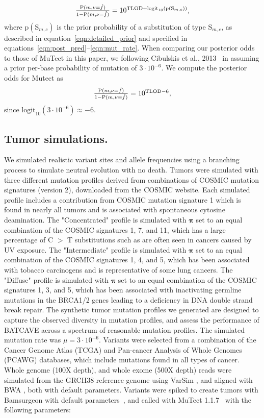 \documentclass[a4,center,fleqn]{NAR}
\newcommand{\batcave}{BATCAVE }
\begin{document}
\begin{equation}
  \label{eqn:computed_posterior}
  $$
  \frac{\mathrm{P}(m,\nu = \hat{f})}{1 - \mathrm{P}(m,\nu = \hat{f})} = 10^{\mathrm{TLOD} + \mathrm{logit}_{10}(\mathrm{p}(\mathrm{S}_{m,c}))},
  $$
\end{equation}
where $\mathrm{p}(\mathrm{S}_{m,c})$ is the prior probability of a substitution of type $\mathrm{S}_{m,c}$, as described in equation~\ref{eqn:detailed_prior} and specified in equations~\ref{eqn:post_pred}--\ref{eqn:mut_rate}.
When comparing our posterior odds to those of MuTect in this paper, we following Cibulskis et al., 2013~\citep{Cibulskis2013} in assuming a prior per-base probability of mutation of $3\cdot10^{-6}$.
We compute the posterior odds for Mutect as
\begin{equation}
  \label{eqn:mutect_posterior}
  $$
  \frac{\mathrm{P}(m,\nu = \hat{f})}{1 - \mathrm{P}(m,\nu = \hat{f})} = 10^{\mathrm{TLOD} - 6},
  $$
\end{equation}
since $\mathrm{logit}_{10}(3\cdot10^{-6}) \approx -6$.

\subsection{Tumor simulations.}
We simulated realistic variant sites and allele frequencies using a branching process to simulate neutral evolution with no death.
Tumors were simulated with three different mutation profiles derived from combinations of COSMIC mutation signatures (version 2), downloaded from the COSMIC website.
Each simulated profile includes a contribution from COSMIC mutation signature 1 which is found in nearly all tumors and is associated with spontaneous cytosine deamination.
The "Concentrated" profile is simulated with $\mathbf{\pi}$ set to an equal combination of the COSMIC signatures 1, 7, and 11, which has a large percentage of C $>$ T substitutions such as are often seen in cancers caused by UV exposure.
The "Intermediate" profile is simulated with $\mathbf{\pi}$ set to an equal combination of the COSMIC signatures 1, 4, and 5, which has been associated with tobacco carcinogens and is representative of some lung cancers.
The "Diffuse" profile is simulated with $\mathbf{\pi}$ set to an equal combination of the COSMIC signatures 1, 3, and 5, which has been associated with inactivating germline mutations in the BRCA1/2 genes leading to a deficiency in DNA double strand break repair.
The synthetic tumor mutation profiles we generated are designed to capture the observed diversity in mutation profiles, and assess the performance of \batcave across a spectrum of reasonable mutation profiles.
The simulated mutation rate was $\mu = 3\cdot10^{-6}$.
Variants were selected from a combination of the Cancer Genome Atlas (TCGA) and Pan-cancer Analysis of Whole Genomes (PCAWG) databases, which include mutations found in all types of cancer.
Whole genome (100X depth), and whole exome (500X depth) reads were simulated from the GRCH38 reference genome using VarSim \cite{Mu2015}, and aligned with BWA \cite{Li2009a}, both with default parameters.
Variants were spiked to create tumors with Bamsurgeon with default parameters~\citep{Ewing2015a},
and called with MuTect 1.1.7~\cite{Cibulskis2013} with the following parameters:
\end{document}
